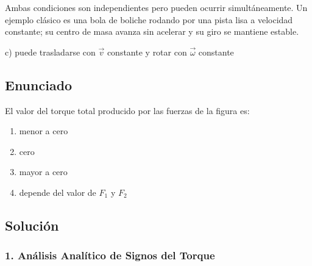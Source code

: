 \documentclass[12pt, a4paper]{article}
\begin{document}
Ambas condiciones son independientes pero pueden ocurrir simultáneamente. Un ejemplo clásico es una bola de boliche rodando por una pista lisa a velocidad constante; su centro de masa avanza sin acelerar y su giro se mantiene estable.

\begin{tcolorbox}[colback=green!5!white, colframe=green!50!black, title=Respuesta Final]
\centering \Large c) puede trasladarse con $\vec{v}$ constante y rotar con $\vec{\omega}$ constante
\end{tcolorbox}

\newpage

\subsection*{Enunciado}
El valor del torque total producido por las fuerzas de la figura es:

\begin{center}
\end{center}

\begin{enumerate}[label=\alph*)]
    \item menor a cero
    \item cero
    \item mayor a cero
    \item depende del valor de $F_1$ y $F_2$
\end{enumerate}

\subsection*{Solución}

\subsubsection*{1. Análisis Analítico de Signos del Torque}
\end{document}
